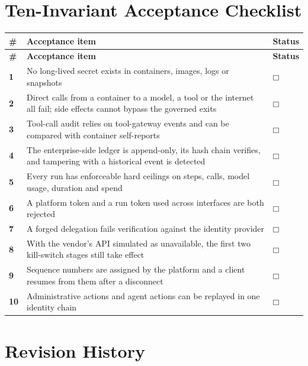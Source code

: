 \section{Ten-Invariant Acceptance Checklist}
\label{app:checklist}

\begin{longtable}{@{}>{\bfseries}C{0.8cm}L{\dimexpr\textwidth-2.4cm-4\tabcolsep\relax}C{1.6cm}@{}}
  \toprule
  \textbf{\#} & \textbf{Acceptance item} & \textbf{Status}\\
  \midrule
  \endfirsthead
  \toprule
  \textbf{\#} & \textbf{Acceptance item} & \textbf{Status}\\
  \midrule
   & No long-lived secret exists in containers, images, logs or snapshots & $\mdlgwhtsquare$\\
  2 & Direct calls from a container to a model, a tool or the internet all fail; side effects cannot bypass the governed exits & $\mdlgwhtsquare$\\
  3 & Tool-call audit relies on tool-gateway events and can be compared with container self-reports & $\mdlgwhtsquare$\\
  4 & The enterprise-side ledger is append-only, its hash chain verifies, and tampering with a historical event is detected & $\mdlgwhtsquare$\\
  5 & Every run has enforceable hard ceilings on steps, calls, model usage, duration and spend & $\mdlgwhtsquare$\\
  6 & A platform token and a run token used across interfaces are both rejected & $\mdlgwhtsquare$\\
  7 & A forged delegation fails verification against the identity provider & $\mdlgwhtsquare$\\
  8 & With the vendor's API simulated as unavailable, the first two kill-switch stages still take effect & $\mdlgwhtsquare$\\
  9 & Sequence numbers are assigned by the platform and a client resumes from them after a disconnect & $\mdlgwhtsquare$\\
  10 & Administrative actions and agent actions can be replayed in one identity chain & $\mdlgwhtsquare$\\
  \bottomrule
\end{longtable}

\section{Revision History}
\label{app:release}


